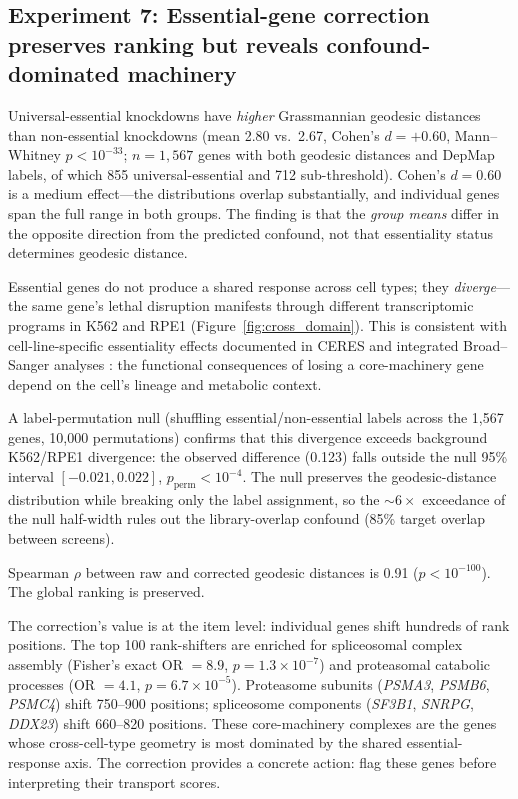 \documentclass[11pt]{article}
\begin{document}
\subsection{Experiment 7: Essential-gene correction preserves ranking
but reveals confound-dominated machinery}

Universal-essential knockdowns have \emph{higher} Grassmannian geodesic
distances than non-essential knockdowns (mean 2.80 vs.\ 2.67, Cohen's $d =
+0.60$, Mann--Whitney $p < 10^{-33}$; $n = 1{,}567$ genes with both
geodesic distances and DepMap labels, of which 855 universal-essential and
712 sub-threshold). Cohen's $d = 0.60$ is a medium effect---the
distributions overlap substantially, and individual genes span the full
range in both groups. The finding is that the \emph{group means} differ
in the opposite direction from the predicted confound, not that essentiality
status determines geodesic distance.

Essential genes do not produce a shared response across cell types; they
\emph{diverge}---the same gene's lethal disruption manifests through
different transcriptomic programs in K562 and RPE1
(Figure~\ref{fig:cross_domain}). This is consistent with cell-line-specific
essentiality effects documented in CERES \citep{meyers2017ceres} and
integrated Broad--Sanger analyses \citep{pacini2021integrated}: the
functional consequences of losing a core-machinery gene depend on
the cell's lineage and metabolic context.

A label-permutation null (shuffling essential/non-essential labels across
the 1{,}567 genes, 10{,}000 permutations) confirms that this divergence
exceeds background K562/RPE1 divergence: the observed difference (0.123)
falls outside the null 95\% interval $[-0.021, 0.022]$,
$p_{\text{perm}} < 10^{-4}$. The null preserves the geodesic-distance
distribution while breaking only the label assignment, so the ${\sim}6\times$
exceedance of the null half-width rules out the library-overlap confound
(85\% target overlap between screens).

Spearman $\rho$ between raw and corrected geodesic distances is 0.91
($p < 10^{-100}$). The global ranking is preserved.

The correction's value is at the item level: individual genes shift
hundreds of rank positions. The top 100 rank-shifters are enriched for
spliceosomal complex assembly (Fisher's exact OR $= 8.9$,
$p = 1.3 \times 10^{-7}$) and proteasomal catabolic processes
(OR $= 4.1$, $p = 6.7 \times 10^{-5}$). Proteasome subunits
(\emph{PSMA3}, \emph{PSMB6}, \emph{PSMC4}) shift 750--900 positions;
spliceosome components (\emph{SF3B1}, \emph{SNRPG}, \emph{DDX23}) shift
660--820 positions. These core-machinery complexes are the genes whose
cross-cell-type geometry is most dominated by the shared essential-response
axis. The correction provides a concrete action: flag these genes before
interpreting their transport scores.
\end{document}
